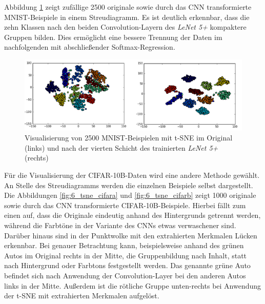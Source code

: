 Abbildung \ref{fig:6_tsne_mnist} zeigt zufällige 2500 originale sowie durch das CNN transformierte MNIST-Beispiele in einem Streudiagramm. Es ist deutlich erkennbar, dass die zehn Klassen nach den beiden Convolution-Layern des \textit{LeNet 5+} kompaktere Gruppen bilden. Dies ermöglicht eine bessere Trennung der Daten im nachfolgenden mit abschließender Softmax-Regression.

\begin{figure}
\centering
\includegraphics[width=0.9\linewidth]{images/6_tsne_mnist}
\caption[]{Visualisierung von 2500 MNIST-Beispielen mit t-SNE im Original (links) und nach der vierten Schicht des trainierten \textit{LeNet 5+} (rechts)}
\label{fig:6_tsne_mnist}
\end{figure}

Für die Visualisierung der CIFAR-10B-Daten wird eine andere Methode gewählt. An Stelle des Streudiagramms werden die einzelnen Beispiele selbst dargestellt. Die Abbildungen \ref{fig:6_tsne_cifara} und \ref{fig:6_tsne_cifarb} zeigt 1000 originale sowie durch das CNN transformierte CIFAR-10B-Beispiele. Hierbei fällt zum einen auf, dass die Originale eindeutig anhand des Hintergrunds getrennt werden, während die Farbtöne in der Variante des CNNs etwas verwaschener sind. Darüber hinaus sind in der Punktwolke mit den extrahierten Merkmalen Lücken erkennbar. Bei genauer Betrachtung kann, beispielsweise anhand des grünen Autos im Original rechts in der Mitte, die Gruppenbildung nach Inhalt, statt nach Hintergrund oder Farbtons  festgestellt werden. Das genannte grüne Auto befindet sich nach Anwendung der Convolution-Layer bei den anderen Autos links in der Mitte. Außerdem ist die rötliche Gruppe unten-rechts bei Anwendung der t-SNE mit extrahierten Merkmalen aufgelöst.


